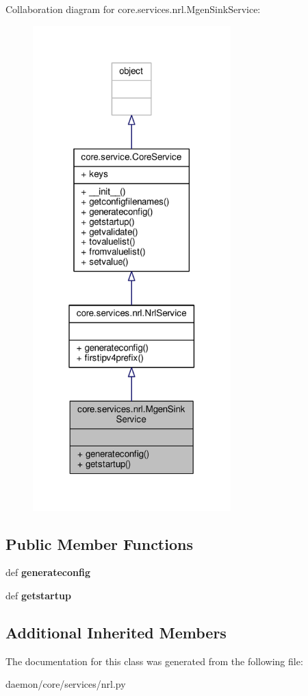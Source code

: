 Collaboration diagram for core.\+services.\+nrl.\+Mgen\+Sink\+Service\+:
\nopagebreak
\begin{figure}[H]
\begin{center}
\leavevmode
\includegraphics[width=217pt]{classcore_1_1services_1_1nrl_1_1_mgen_sink_service__coll__graph}
\end{center}
\end{figure}
\subsection*{Public Member Functions}
\begin{DoxyCompactItemize}
\item 
\hypertarget{classcore_1_1services_1_1nrl_1_1_mgen_sink_service_a901216842f29ad6bf32bb3c0bf914872}{def {\bfseries generateconfig}}\label{classcore_1_1services_1_1nrl_1_1_mgen_sink_service_a901216842f29ad6bf32bb3c0bf914872}

\item 
\hypertarget{classcore_1_1services_1_1nrl_1_1_mgen_sink_service_a75bbef88178c6b4c4395777d6bcb67df}{def {\bfseries getstartup}}\label{classcore_1_1services_1_1nrl_1_1_mgen_sink_service_a75bbef88178c6b4c4395777d6bcb67df}

\end{DoxyCompactItemize}
\subsection*{Additional Inherited Members}


The documentation for this class was generated from the following file\+:\begin{DoxyCompactItemize}
\item 
daemon/core/services/nrl.\+py\end{DoxyCompactItemize}
